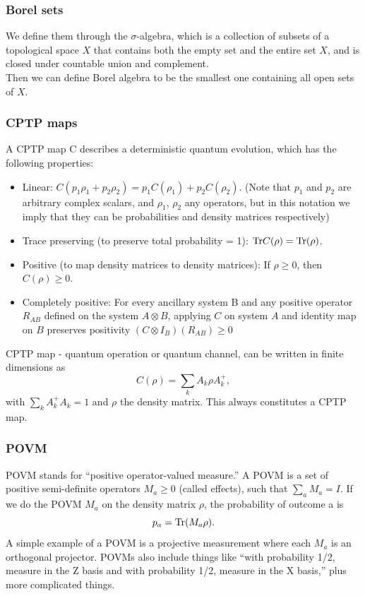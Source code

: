 \documentclass{article}
\begin{document}
\subsubsection{Borel sets}
We define them through the $\sigma$-algebra, which is a collection of subsets of a topological space $\displaystyle X$ that contains both the empty set and the entire set $\displaystyle X$, and is closed under countable union and complement. \\
Then we can define Borel algebra to be the smallest one containing all open sets of
$\displaystyle X$.\\
\subsubsection{CPTP maps}
A CPTP map C describes a deterministic quantum evolution, which has the
following properties:
\begin{itemize}
    \item Linear: $C(p_1\rho_1 +p_2\rho_2) = p_1C(\rho_1)+p_2C(\rho_2)$. (Note that $p_1$ and $p_2$ are arbitrary complex scalars, and $\rho_1$, $\rho_2$ any operators, but in this notation we imply that they can be probabilities and density matrices respectively)
    \item Trace preserving (to preserve total probability = 1): $\text{Tr} C(\rho) = \text{Tr}(\rho)$.
    \item Positive (to map density matrices to density matrices): If $\rho \geq 0$, then $C(\rho) \geq 0$.
    \item Completely positive: For every ancillary system B and any positive operator $R_{AB}$ defined on the system $A\otimes B$, applying $C$ on system $A$ and identity map on $B$ preserves positivity $(C\otimes I_B) (R_{AB}) \geq0$
\end{itemize}
CPTP map - quantum operation or quantum channel, can be written in finite dimensions as 
\begin{equation}
        C(\rho) = \sum_kA_k\rho A_k^+, 
\end{equation}
with $\sum_kA_k^+A_k = 1$ and $\rho$ the density matrix. This always constitutes a CPTP map.\\
\subsubsection{POVM}
 POVM stands for “positive operator-valued measure.”
A POVM is a set of positive semi-definite operators $M_a \geq 0$ (called effects), such that $\sum_aM_a = I$. If we do the POVM $M_a$ on the density matrix $\rho$, the probability of outcome a is
\begin{equation}
    p_a = \text{Tr}(M_a\rho).    
\end{equation}
A simple example of a POVM is a projective measurement where each $M_a$ is an orthogonal projector. POVMs also include things like “with probability 1/2, measure in the Z basis and with probability 1/2, measure in the X basis,” plus more complicated things.
\end{document}

